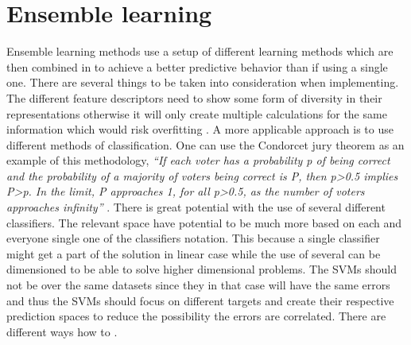 
\section{Ensemble learning}

Ensemble learning methods use a setup of different learning methods which are then combined in to achieve a better predictive behavior than if using a single one. There are several things to be taken into consideration when implementing. The different feature descriptors need to show some form of diversity in their representations otherwise it will only create multiple calculations for the same information which would risk overfitting \cite{cunningham2000diversity}\cite{krogh1995neural}. A more applicable approach is to use different methods of classification. One can use the Condorcet jury theorem as an example of this methodology, \textit{``If each voter has a probability p of being correct and the probability of a majority of voters being correct is P, then p>0.5 implies P>p. In the limit, P approaches 1, for all p>0.5, as the number of voters approaches infinity''} \cite{cord2008machine}\cite{grofman1983thirteen}.
There is great potential with the use of several different classifiers. The relevant space have potential to be much more based on each and everyone single one of the classifiers notation. This because a single classifier  might get a part of the solution in linear case while the use of several can be dimensioned to be able to solve higher dimensional problems. The SVMs should not be over the same datasets since they in that case will have the same errors and thus the SVMs should focus on different targets and create their respective prediction spaces to reduce the possibility the errors are correlated. There are different ways how to \cite{kim2003ensembleSVM}. 


